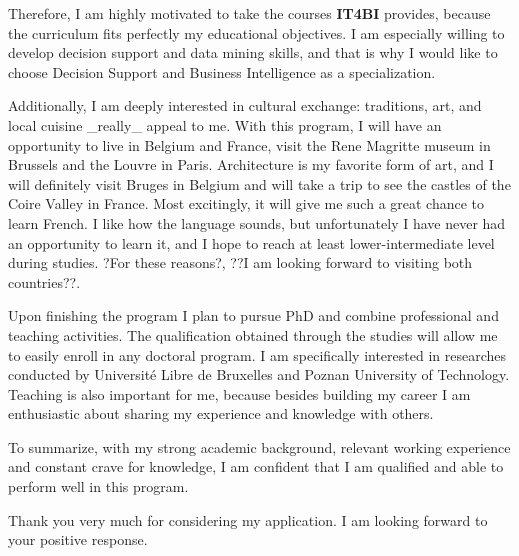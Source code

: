 \documentclass[a4paper,14pt]{extarticle}
\begin{document}
Therefore, I am highly motivated to take the courses \textbf{IT4BI} provides, because the curriculum fits perfectly my educational objectives. I am especially willing to develop decision support and data mining skills, and that is why I would like to choose Decision Support and Business Intelligence as a specialization.

Additionally, I am deeply interested in cultural exchange: traditions, art, and local cuisine _really_ appeal to me. With this program, I will have an opportunity to live in Belgium and France, visit the Rene Magritte museum in Brussels and the Louvre in Paris. Architecture is my favorite form of art, and I will definitely visit Bruges in Belgium and will take a trip to see the castles of the Coire Valley in France. Most excitingly, it will give me such a great chance to learn French. I like how the language sounds, but unfortunately I have never had an opportunity to learn it, and I hope to reach at least lower-intermediate level during studies. ?For these reasons?, ??I am looking forward to visiting both countries??.

Upon finishing the program I plan to pursue PhD and combine professional and teaching activities. The qualification obtained through the studies will allow me to easily enroll in any doctoral program. I am specifically interested in researches conducted by Université Libre de Bruxelles and Poznan University of Technology. Teaching is also important for me, because besides building my career I am enthusiastic about sharing my experience and knowledge with others.

To summarize, with my strong academic background, relevant working experience and constant crave for knowledge, I am confident that I am qualified and able to perform well in this program.

Thank you very much for considering my application. I am looking forward to your positive response.
\end{document}
